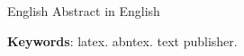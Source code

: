 \begin{resumo}[Abstract]
	\begin{otherlanguage*}{English}
		Abstract in English
		
		\vspace{\onelineskip}
		\noindent
		\textbf{Keywords}: latex. abntex. text publisher.
		
	\end{otherlanguage*}
\end{resumo}